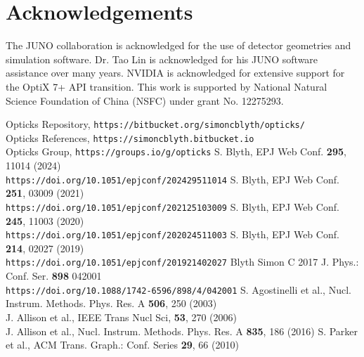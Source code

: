 \documentclass{webofc}
\begin{document}
\section*{Acknowledgements}
%
The JUNO collaboration is acknowledged for the use of detector 
geometries and simulation software. Dr. Tao Lin is acknowledged 
for his JUNO software assistance over many years. NVIDIA is acknowledged for extensive 
support for the OptiX 7+ API transition.
%
This work is supported by National Natural Science Foundation of China (NSFC)
under grant No. 12275293.
%
\begin{thebibliography}{}
%
Opticks Repository, {\tt https://bitbucket.org/simoncblyth/opticks/}\\
Opticks References, {\tt https://simoncblyth.bitbucket.io}\\
Opticks Group, {\tt https://groups.io/g/opticks}
%
S. Blyth, EPJ Web Conf. {\bf 295}, 11014 (2024) \\
{\tt https://doi.org/10.1051/epjconf/202429511014}
S. Blyth, EPJ Web Conf. {\bf 251}, 03009 (2021) \\
{\tt https://doi.org/10.1051/epjconf/202125103009}
S. Blyth, EPJ Web Conf. {\bf 245}, 11003 (2020) \\
{\tt https://doi.org/10.1051/epjconf/202024511003}
S. Blyth, EPJ Web Conf. {\bf 214}, 02027 (2019) \\
{\tt https://doi.org/10.1051/epjconf/201921402027}
Blyth Simon C 2017 J. Phys.: Conf. Ser. {\bf 898} 042001 \\
{\tt https://doi.org/10.1088/1742-6596/898/4/042001}
%
S. Agostinelli et al., Nucl. Instrum. Methods. Phys. Res. A {\bf 506}, 250 (2003)\\
\hspace*{0.0em}J. Allison et al., IEEE Trans Nucl Sci, {\bf 53}, 270 (2006)\\
\hspace*{0.0em}J. Allison et al., Nucl. Instrum. Methods. Phys. Res. A {\bf 835}, 186 (2016)
%
%
S. Parker et al., ACM Trans. Graph.: Conf. Series {\bf 29}, 66 (2010)\\

\end{thebibliography}
\end{document}
